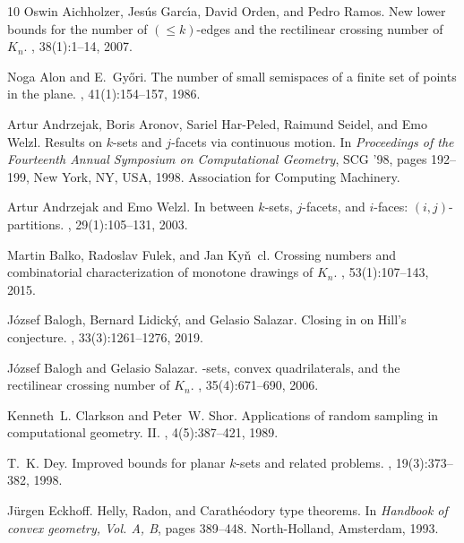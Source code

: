 \documentclass[11pt]{article}
\renewcommand{\leq}{\leqslant}
\begin{document}
\begin{thebibliography}{10}
Oswin Aichholzer, Jes\'{u}s Garc\'{\i}a, David Orden, and Pedro Ramos.
\newblock New lower bounds for the number of {$(\leq k)$}-edges and the
  rectilinear crossing number of {$K_n$}.
, 38(1):1--14, 2007.

Noga Alon and E.~Gy\H{o}ri.
\newblock The number of small semispaces of a finite set of points in the
  plane.
, 41(1):154--157, 1986.

Artur Andrzejak, Boris Aronov, Sariel Har-Peled, Raimund Seidel, and Emo Welzl.
\newblock Results on $k$-sets and $j$-facets via continuous motion.
\newblock In {\em Proceedings of the Fourteenth Annual Symposium on
  Computational Geometry}, SCG '98, pages 192--199, New York, NY, USA, 1998.
  Association for Computing Machinery.

Artur Andrzejak and Emo Welzl.
\newblock In between {$k$}-sets, {$j$}-facets, and {$i$}-faces:
  {$(i,j)$}-partitions.
, 29(1):105--131, 2003.

Martin Balko, Radoslav Fulek, and Jan Kyn\v~cl.
\newblock Crossing numbers and combinatorial characterization of monotone
  drawings of {$K_n$}.
, 53(1):107--143, 2015.

J\'{o}zsef Balogh, Bernard Lidick\'{y}, and Gelasio Salazar.
\newblock Closing in on {H}ill's conjecture.
, 33(3):1261--1276, 2019.

J\'{o}zsef Balogh and Gelasio Salazar.
-sets, convex quadrilaterals, and the rectilinear crossing
  number of {$K_n$}.
, 35(4):671--690, 2006.

Kenneth~L. Clarkson and Peter~W. Shor.
\newblock Applications of random sampling in computational geometry. {II}.
, 4(5):387--421, 1989.

T.~K. Dey.
\newblock Improved bounds for planar {$k$}-sets and related problems.
, 19(3):373--382, 1998.

J\"{u}rgen Eckhoff.
\newblock Helly, {R}adon, and {C}arath\'{e}odory type theorems.
\newblock In {\em Handbook of convex geometry, {V}ol. {A}, {B}}, pages
  389--448. North-Holland, Amsterdam, 1993.


\end{thebibliography}
\end{document}
